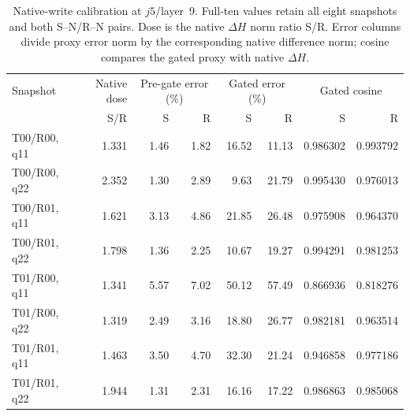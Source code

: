 \begin{table}[!h]
\centering
\caption{Native-write calibration at $j5$/layer~9. Full-ten values retain all eight snapshots and both S--N/R--N pairs. Dose is the native $\Delta H$ norm ratio S/R. Error columns divide proxy error norm by the corresponding native difference norm; cosine compares the gated proxy with native $\Delta H$.}
\label{tab:native-fidelity}
\setlength{\tabcolsep}{5pt}
\renewcommand{\arraystretch}{1.15}
\begin{tabular}{@{}lrrrrrrr@{}}\toprule
Snapshot & Native dose & \multicolumn{2}{c}{Pre-gate error (\%)} & \multicolumn{2}{c}{Gated error (\%)} & \multicolumn{2}{c}{Gated cosine}\\
 & S/R & S & R & S & R & S & R\\\midrule
T00/R00, q11 & 1.331 & 1.46 & 1.82 & 16.52 & 11.13 & 0.986302 & 0.993792\\
T00/R00, q22 & 2.352 & 1.30 & 2.89 & 9.63 & 21.79 & 0.995430 & 0.976013\\
T00/R01, q11 & 1.621 & 3.13 & 4.86 & 21.85 & 26.48 & 0.975908 & 0.964370\\
T00/R01, q22 & 1.798 & 1.36 & 2.25 & 10.67 & 19.27 & 0.994291 & 0.981253\\
T01/R00, q11 & 1.341 & 5.57 & 7.02 & 50.12 & 57.49 & 0.866936 & 0.818276\\
T01/R00, q22 & 1.319 & 2.49 & 3.16 & 18.80 & 26.77 & 0.982181 & 0.963514\\
T01/R01, q11 & 1.463 & 3.50 & 4.70 & 32.30 & 21.24 & 0.946858 & 0.977186\\
T01/R01, q22 & 1.944 & 1.31 & 2.31 & 16.16 & 17.22 & 0.986863 & 0.985068\\
\bottomrule
\end{tabular}
\end{table}
